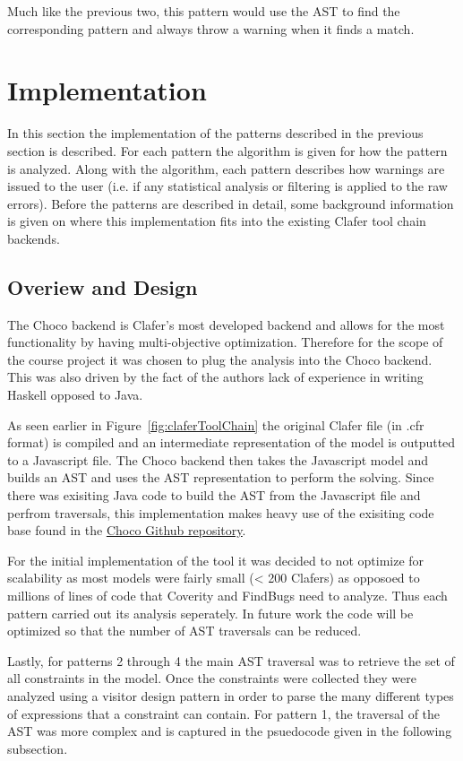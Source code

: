 \documentclass[10pt,oneside]{IEEEtran}
\begin{document}
Much like the previous two, this pattern would use the AST to find the corresponding pattern and always throw a warning when it finds a match.

\section{Implementation}
\label{sec:implementation}
In this section the implementation of the patterns described in the previous section is described. For each pattern the algorithm is given for how the pattern is analyzed. Along with the algorithm, each pattern describes how warnings are issued to the user (i.e. if any statistical analysis or filtering is applied to the raw errors). Before the patterns are described in detail, some background information is given on where this implementation fits into the existing Clafer tool chain backends.

\subsection{Overiew and Design}
The Choco backend is Clafer's most developed backend and allows for the most functionality by having multi-objective optimization. Therefore for the scope of the course project it was chosen to plug the analysis into the Choco backend. This was also driven by the fact of the authors lack of experience in writing Haskell opposed to Java.

As seen earlier in Figure~\ref{fig:claferToolChain} the original Clafer file (in .cfr format) is compiled and an intermediate representation of the model is outputted to a Javascript file. The Choco backend then takes the Javascript model and builds an AST and uses the AST representation to perform the solving. Since there was exisiting Java code to build the AST from the Javascript file and perfrom traversals, this implementation makes heavy use of the exisiting code base found in the \href{https://github.com/gsdlab/chocosolver/}{\underline{Choco Github repository}}.

For the initial implementation of the tool it was decided to not optimize for scalability as most models were fairly small (< 200 Clafers) as opposoed to millions of lines of code that Coverity and FindBugs need to analyze. Thus each pattern carried out its analysis seperately. In future work the code will be optimized so that the number of AST traversals can be reduced.

Lastly, for patterns 2 through 4 the main AST traversal was to retrieve the set of all constraints in the model. Once the constraints were collected they were analyzed using a visitor design pattern in order to parse the many different types of expressions that a constraint can contain. For pattern 1, the traversal of the AST was more complex and is captured in the psuedocode given in the following subsection.
\end{document}
